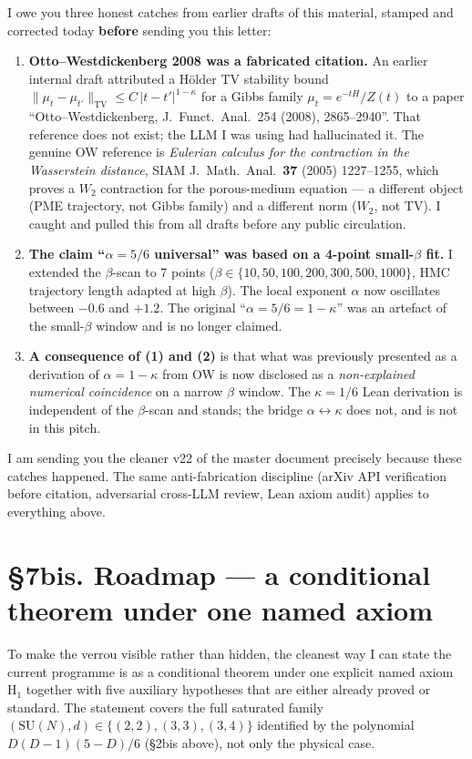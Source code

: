 \documentclass[11pt,a4paper]{article}
\newcommand{\TV}{\mathrm{TV}}
\newcommand{\SU}[1]{\mathrm{SU}(#1)}
\begin{document}
I owe you three honest catches from earlier drafts of this material, stamped and corrected today \textbf{before} sending you this letter:
\begin{enumerate}
  \item \textbf{Otto--Westdickenberg 2008 was a fabricated citation.} An earlier internal draft attributed a Hölder TV stability bound $\|\mu_t - \mu_{t'}\|_\TV \le C\,|t-t'|^{1-\kappa}$ for a Gibbs family $\mu_t = e^{-tH}/Z(t)$ to a paper ``Otto--Westdickenberg, J.\ Funct.\ Anal.\ 254 (2008), 2865--2940''. That reference does not exist; the LLM I was using had hallucinated it. The genuine OW reference is \emph{Eulerian calculus for the contraction in the Wasserstein distance}, SIAM J.\ Math.\ Anal.\ \textbf{37} (2005) 1227--1255, which proves a $W_2$ contraction for the porous-medium equation --- a different object (PME trajectory, not Gibbs family) and a different norm ($W_2$, not TV). I caught and pulled this from all drafts before any public circulation.
  \item \textbf{The claim ``$\alpha = 5/6$ universal'' was based on a 4-point small-$\beta$ fit.} I extended the $\beta$-scan to 7 points ($\beta \in \{10, 50, 100, 200, 300, 500, 1000\}$, HMC trajectory length adapted at high $\beta$). The local exponent $\alpha$ now oscillates between $-0.6$ and $+1.2$. The original ``$\alpha = 5/6 = 1 - \kappa$'' was an artefact of the small-$\beta$ window and is no longer claimed.
  \item \textbf{A consequence of (1) and (2)} is that what was previously presented as a derivation of $\alpha = 1 - \kappa$ from OW is now disclosed as a \emph{non-explained numerical coincidence} on a narrow $\beta$ window. The $\kappa = 1/6$ Lean derivation is independent of the $\beta$-scan and stands; the bridge $\alpha \leftrightarrow \kappa$ does not, and is not in this pitch.
\end{enumerate}
I am sending you the cleaner v22 of the master document precisely because these catches happened. The same anti-fabrication discipline (arXiv API verification before citation, adversarial cross-LLM review, Lean axiom audit) applies to everything above.

\section*{§7bis. Roadmap --- a conditional theorem under one named axiom}

To make the verrou visible rather than hidden, the cleanest way I can state the current programme is as a conditional theorem under one explicit named axiom $\mathrm{H}_1$ together with five auxiliary hypotheses that are either already proved or standard. The statement covers the full saturated family $(\SU{N}, d) \in \{(2, 2), (3, 3), (3, 4)\}$ identified by the polynomial $D(D-1)(5-D)/6$ (§2bis above), not only the physical case.
\end{document}
